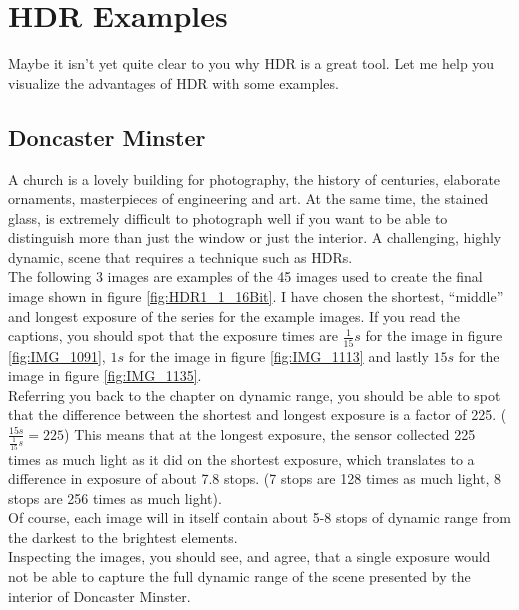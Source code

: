 \section{HDR Examples}

Maybe it isn't yet quite clear to you why \gls{HDR} is a great tool. Let me help you visualize the advantages of \gls{HDR} with some examples.

\subsection{Doncaster Minster}

A church is a lovely building for photography, the history of centuries, elaborate ornaments, masterpieces of engineering and art. At the same time, the stained glass, is extremely difficult to photograph well if you want to be able to distinguish more than just the window or just the interior. A challenging, highly dynamic, scene that requires a technique such as \glspl{HDR}.
\\[\baselineskip]
The following 3 images are examples of the 45 images used to create the final image shown in figure \ref{fig:HDR1_1_16Bit}. I have chosen the shortest, ``middle'' and longest \gls{exposure} of the series for the example images. If you read the captions, you should spot that the exposure times are $\frac{1}{15}s$ for the image in figure \ref{fig:IMG_1091}, $1s$ for the image in figure \ref{fig:IMG_1113} and lastly $15s$ for the image in figure \ref{fig:IMG_1135}.
\\
Referring you back to the chapter on dynamic range, you should be able to spot that the difference between the shortest and longest \gls{exposure} is a factor of 225. ($\frac{15s}{\frac{1}{15}s} = 225$) This means that at the longest \gls{exposure}, the \gls{sensor} collected 225 times as much light as it did on the shortest \gls{exposure}, which translates to a difference in \gls{exposure} of about 7.8 \glspl{stop}. (7 \glspl{stop} are 128 times as much light, 8 \glspl{stop} are 256 times as much light).
\\
Of course, each image will in itself contain about 5-8 \glspl{stop} of dynamic range from the darkest to the brightest elements.
\\[\baselineskip]
Inspecting the images, you should see, and agree, that a single \gls{exposure} would not be able to capture the full dynamic range of the scene presented by the interior of Doncaster Minster.

